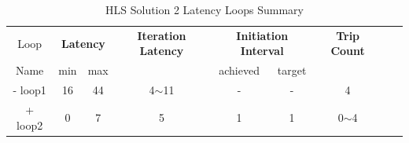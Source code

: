\begin{table}[H]
	\centering
	\begin{tabular}{|c|c|c|c|c|c|c|c|c|}
		\hline
		\multicolumn{1}{|c|}{Loop} & \multicolumn{2}{|c|}{\textbf{Latency}} & \multicolumn{1}{c|}{\textbf{Iteration Latency}} & \multicolumn{2}{c|}{\textbf{Initiation Interval}} & \multicolumn{1}{c|}{\textbf{Trip Count}}  \\
		Name & min & max &  & achieved & target &  \\
		\hline
		- loop1 & 16 & 44 & 4$\sim$11 & - & - & 4 \\
		+ loop2 & 0 & 7 & 5 & 1 & 1 & 0$\sim$4 \\
		\hline
	\end{tabular}
	\caption{HLS Solution 2 Latency Loops Summary}
	\label{tab:hls-solution-2-loop-summary}
\end{table}

